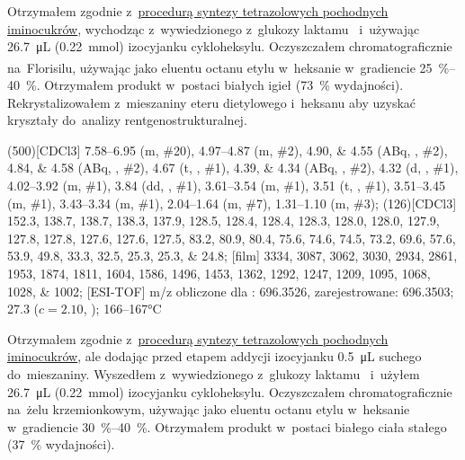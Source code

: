 Otrzymałem zgodnie z~\hyperref[experimental:sugars:schwartz]{procedurą syntezy tetrazolowych
	pochodnych iminocukrów}, wychodząc z~wywiedzionego z~glukozy laktamu~
	i~używając \SI{26.7}{\micro\liter} (\SI{0.22}{\milli\mol}) izocyjanku cykloheksylu.
Oczyszczałem chromatograficznie na~Florisilu\textsuperscript{\textregistered},
	używając jako eluentu octanu etylu w~heksanie w~gradiencie \SIrange{25}{40}{\percent}.
Otrzymałem produkt w~postaci białych igieł (\SI{73}{\percent} wydajności).
Rekrystalizowałem z~mieszaniny eteru dietylowego i~heksanu aby uzyskać kryształy
	do~analizy rentgenostrukturalnej.

\begin{fullexp}
	\NMR(500)[CDCl3] \numrange{7.58}{6.95} (m, \#{20}), \numrange{4.97}{4.87} (m, \#{2}), \numlist{4.90;4.55} (ABq, , \#{2}), \numlist{4.84;4.58} (ABq, , \#{2}), \num{4.67} (t, , \#{1}), \numlist{4.39;4.34} (ABq, , \#{2}), \num{4.32} (d, , \#{1}), \numrange{4.02}{3.92} (m, \#{1}), \num{3.84} (dd, , \#{1}), \numrange{3.61}{3.54} (m, \#{1}), \num{3.51} (t, , \#{1}), \numrange{3.51}{3.45} (m, \#{1}), \numrange{3.43}{3.34} (m, \#{1}), \numrange{2.04}{1.64} (m, \#{7}), \numrange{1.31}{1.10} (m, \#{3});
	(126)[CDCl3] \numlist{152.3; 138.7; 138.7; 138.3; 137.9; 128.5; 128.4; 128.4; 128.3; 128.0; 128.0; 127.9; 127.8; 127.8; 127.6; 127.6; 127.5; 83.2; 80.9; 80.4; 75.6; 74.6; 74.5; 73.2; 69.6; 57.6; 53.9; 49.8; 33.3; 32.5; 25.3; 25.3; 24.8};
	[film] \numlist{3334; 3087; 3062; 3030; 2934; 2861; 1953; 1874; 1811; 1604; 1586; 1496; 1453; 1362; 1292; 1247; 1209; 1095; 1068; 1028; 1002};
	[ESI-TOF] m/z obliczone dla : \num{696.3526}, zarejestrowane: \num{696.3503};
	\data{[$\alpha^{23}_D$]~$=$} \num{27.3} ($c = 2.10$, );
	 \numrange{166}{167}\si{\celsius}
\end{fullexp}

Otrzymałem zgodnie z~\hyperref[experimental:sugars:schwartz]{procedurą syntezy tetrazolowych
	pochodnych iminocukrów}, ale dodając przed etapem addycji izocyjanku
	\SI{0.5}{\micro\liter} suchego  do~mieszaniny.
Wyszedłem z~wywiedzionego z~glukozy laktamu~
	i~użyłem \SI{26.7}{\micro\liter} (\SI{0.22}{\milli\mol}) izocyjanku cykloheksylu.
Oczyszczałem chromatograficznie na~żelu krzemionkowym,
	używając jako eluentu octanu etylu w~heksanie w~gradiencie \SIrange{30}{40}{\percent}.
Otrzymałem produkt w~postaci białego ciała stałego (\SI{37}{\percent} wydajności).

